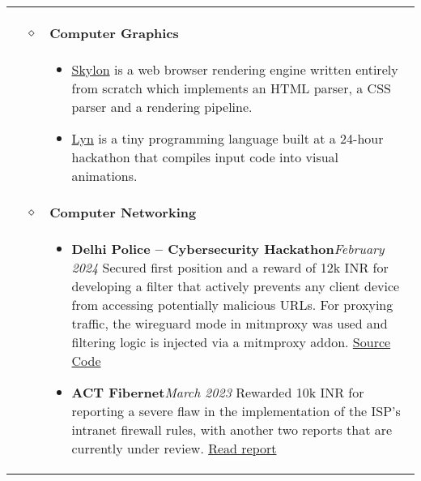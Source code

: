 \documentclass[11pt]{article}
\begin{document}
    \noindent
    \begin{tabularx}{\textwidth}{@{}b{90px} b{9px}@{} X@{}}
        \iftoggle{lines}{\\ \\ \hline \\}{}

        \lettrine[lines=1,loversize=-0.5]{P}ROJECTS & $\diamond$ &

        \textbf{Computer Graphics} \hfill \\ & &
        \vspace{-13pt}
        \begin{itemize}
            \item \href{https://github.com/sujaldev/skylon}{\color{blue}Skylon} is a web browser rendering engine
            written entirely from scratch which implements an HTML parser, a CSS parser and a rendering pipeline.
            \item \href{https://github.com/sujaldev/lyn}{\color{blue}Lyn} is a tiny programming language built at a
            24-hour hackathon that compiles input code into visual animations.
        \end{itemize}

        \\ & $\diamond$ &

        \textbf{Computer Networking} \\ & &
        \vspace{-13pt}
        \begin{itemize}
            \item \textbf{Delhi Police -- Cybersecurity Hackathon}\hfill\textit{February 2024}\newline
            Secured first position and a reward of 12k INR for developing a filter that actively prevents any client
            device from accessing potentially malicious URLs. For proxying traffic, the wireguard mode in mitmproxy
            was used and filtering logic is injected via a mitmproxy addon.
            \href{https://github.com/sujaldev/cerberus}{\color{blue}Source Code}
            \item \textbf{ACT Fibernet}\hfill\textit{March 2023}\newline
            Rewarded 10k INR for reporting a severe flaw in the implementation of the ISP's intranet firewall rules,
            with another two reports that are currently under review.
            \href{https://pdf.sujal.dev/act/report.pdf}{\color{blue} Read report}
        \end{itemize}


\end{tabularx}
\end{document}
